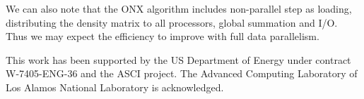 \documentclass[prl,preprint,doublespace]{revtex4} %
\begin{document}
 We can also note that the ONX algorithm includes non-parallel step as
 loading, distributing the density matrix to all
 processors, global summation and I/O. Thus we may expect 
 the efficiency to improve with full data parallelism.


\begin{acknowledgments}
 This work has been supported by the US Department of Energy
 under contract W-7405-ENG-36 and the ASCI project.
 The Advanced Computing Laboratory of Los
 Alamos National Laboratory is acknowledged.
\end{acknowledgments}

%
\newpage
\end{document}
